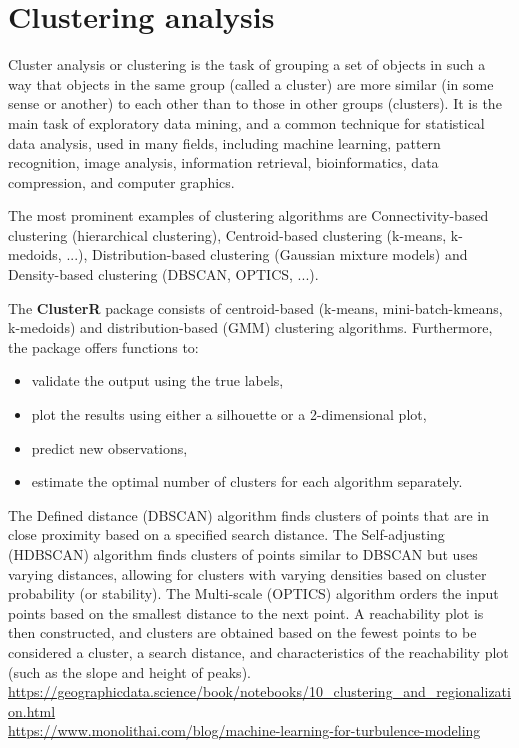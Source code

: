 \chapter{Clustering analysis}
%
Cluster analysis or clustering is the task of grouping a set of objects in such a way that objects in the same group (called a cluster) are more similar (in some sense or another) to each other than to those in other groups (clusters). It is the main task of exploratory data mining, and a common technique for statistical data analysis, used in many fields, including machine learning, pattern recognition, image analysis, information retrieval, bioinformatics, data compression, and computer graphics.

The most prominent examples of clustering algorithms are Connectivity-based clustering (hierarchical clustering), Centroid-based clustering (k-means, k-medoids, ...), Distribution-based clustering (Gaussian mixture models) and Density-based clustering (DBSCAN, OPTICS, ...).

The \textbf{ClusterR} package consists of centroid-based (k-means, mini-batch-kmeans, k-medoids) and distribution-based (GMM) clustering algorithms. Furthermore, the package offers functions to:
\begin{itemize}
    \item    validate the output using the true labels,
    \item     plot the results using either a silhouette or a 2-dimensional plot,
    \item     predict new observations,
    \item     estimate the optimal number of clusters for each algorithm separately.
\end{itemize}

The Defined distance (DBSCAN) algorithm finds clusters of points that are in close proximity based on a specified search distance. The Self-adjusting (HDBSCAN) algorithm finds clusters of points similar to DBSCAN but uses varying distances, allowing for clusters with varying densities based on cluster probability (or stability). The Multi-scale (OPTICS) algorithm orders the input points based on the smallest distance to the next point. A reachability plot is then constructed, and clusters are obtained based on the fewest points to be considered a cluster, a search distance, and characteristics of the reachability plot (such as the slope and height of peaks).
%
\url{https://geographicdata.science/book/notebooks/10_clustering_and_regionalization.html}\\
\url{https://www.monolithai.com/blog/machine-learning-for-turbulence-modeling}\\